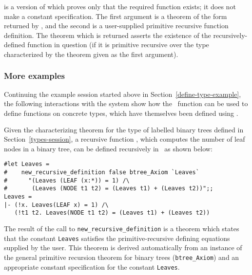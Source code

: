 {{\noindent is a version of  which proves only
that the required function exists; it does not make a constant specification.
The first argument is a theorem of the form returned by ,
and the second is a user-supplied primitive recursive function definition.
The theorem which is returned asserts the existence of the recursively-defined
function in question (if it is primitive recursive over the type characterized
by the theorem given as the first argument). 

\subsubsection{More examples}

Continuing the example session started above in Section~\ref{define-type-example},
the following interactions with the system show how the \ML\ function
 can be used to define functions on concrete types,
which have themselves been defined using .

Given the characterizing theorem
 for the type of labelled binary trees
defined in Section~\ref{types-session}, a recursive function , which
computes the number of leaf nodes in a binary tree, 
can be defined recursively in \HOL\ as shown below:

\begin{session}\begin{verbatim}
#let Leaves = 
#    new_recursive_definition false btree_Axiom `Leaves` 
#      "(Leaves (LEAF (x:*)) = 1) /\
#       (Leaves (NODE t1 t2) = (Leaves t1) + (Leaves t2))";;
Leaves = 
|- (!x. Leaves(LEAF x) = 1) /\
   (!t1 t2. Leaves(NODE t1 t2) = (Leaves t1) + (Leaves t2))
\end{verbatim}\end{session}

\noindent The result of the call to {\small\verb!new_recursive_definition!} is
a theorem which states that the constant {\small\verb!Leaves!} satisfies the
primitive-recursive defining equations supplied by the user.  This theorem is
derived automatically from an instance of the general primitive recursion
theorem for binary trees ({\small\verb!btree_Axiom!}) and an appropriate
constant specification for the constant {\small\verb!Leaves!}. 

}}
